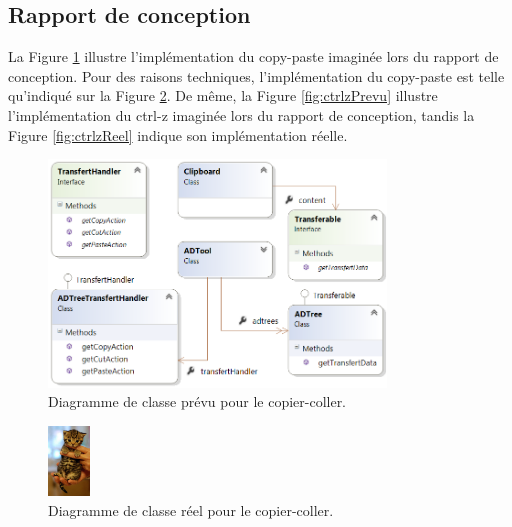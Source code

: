 \newpage
\subsection{Rapport de conception}

La {\sc Figure} \ref{fig:copypastePrevu} illustre l'implémentation du copy-paste imaginée lors du rapport de conception. Pour des raisons techniques, l'implémentation du copy-paste est telle qu'indiqué sur la {\sc Figure} \ref{fig:copypasteReel}. De même, la {\sc Figure} \ref{fig:ctrlzPrevu} illustre l'implémentation du ctrl-z imaginée lors du rapport de conception, tandis la {\sc Figure} \ref{fig:ctrlzReel} indique son implémentation réelle.

		\begin{figure}[H]
            \centering
                \includegraphics[width=0.8\textwidth]{figure/copiercoller.png}
            \caption{Diagramme de classe prévu pour le copier-coller.}
            \label{fig:copypastePrevu}
        \end{figure}
        
        \begin{figure}[H]
            \centering
                \includegraphics[width=0.1\textwidth]{figure/liste.png}
            \caption{Diagramme de classe réel pour le copier-coller.}
            \label{fig:copypasteReel}
        \end{figure}
       
